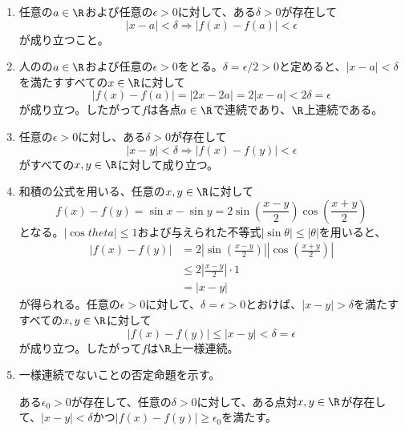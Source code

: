\begin{souanswer} %
\begin{enumerate}
    \item 任意の$a\in \R$および任意の$\epsilon> 0$に対して、ある$\delta > 0$が存在して
\begin{equation*}
    |x- a|< \delta\Rightarrow |f(x)- f(a)|< \epsilon
\end{equation*}
    が成り立つこと。
    \item 人のの$a\in \R$および任意の$\epsilon> 0$をとる。$\delta= \epsilon/2> 0$と定めると、$|x- a|< \delta$を満たすすべての$x\in \R$に対して
\begin{equation*}
    |f(x)- f(a)|= |2x- 2a|= 2|x- a|< 2\delta= \epsilon
\end{equation*}
    が成り立つ。したがって$f$は各点$a\in \R$で連続であり、$\R$上連続である。
    \item 任意の$\epsilon> 0$に対し、ある$\delta> 0$が存在して
\begin{equation*}
    |x- y|< \delta\Rightarrow |f(x)- f(y)|< \epsilon
\end{equation*}
    がすべての$x, y\in \R$に対して成り立つ。
    \item 和積の公式を用いる、任意の$x, y\in \R$に対して
\begin{equation*}
    f(x)- f(y)= \sin{x}- \sin{y}= 2\sin{\left(\frac{x- y}{2}\right)}\cos{\left(\frac{x+ y}{2}\right)}
\end{equation*}
    となる。$|\cos{theta}|\le 1$および与えられた不等式$|\sin{\theta}|\le |\theta|$を用いると、
\begin{align*}
    |f(x)- f(y)|
    &= 2\left|\sin{\left(\frac{x- y}{2}\right)}\right|\left|\cos{\left(\frac{x+ y}{2}\right)}\right|\\
    &\le 2\left|\frac{x- y}{2}\right|\cdot 1\\
    &= |x- y|
\end{align*}
    が得られる。任意の$\epsilon> 0$に対して、$\delta= \epsilon> 0$とおけば、$|x- y|> \delta$を満たすすべての$x, y\in \R$に対して
\begin{equation*}
    |f(x)- f(y)|\le |x- y|< \delta= \epsilon
\end{equation*}
    が成り立つ。したがって$f$は$\R$上一様連続。
    \item 一様連続でないことの否定命題を示す。
\begin{tcolorbox}
    ある$\epsilon_0> 0$が存在して、任意の$\delta > 0$に対して、ある点対$x, y\in \R$が存在して、$|x- y|< \delta$かつ$|f(x)- f(y)|\ge \epsilon_0$を満たす。

\end{tcolorbox}
\end{enumerate}
\end{souanswer}
